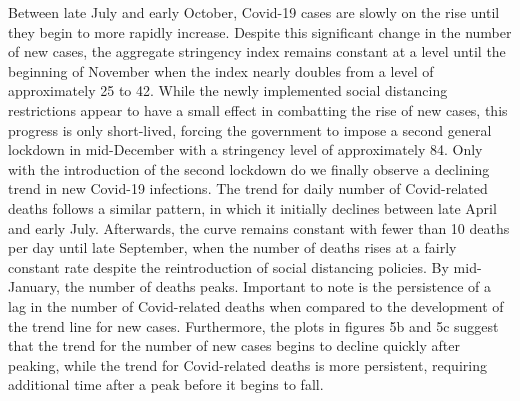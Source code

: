 Between late July and early October, Covid-19 cases are slowly on the rise until they begin to more rapidly increase. Despite this significant change in the number of new cases, the aggregate stringency index remains constant at a level until the beginning of November when the index nearly doubles from a level of approximately 25 to 42. While the newly implemented social distancing restrictions appear to have a small effect in combatting the rise of new cases, this progress is only short-lived, forcing the government to impose a second general lockdown in mid-December with a stringency level of approximately 84. Only with the introduction of the second lockdown do we finally observe a declining trend in new Covid-19 infections. The trend for daily number of Covid-related deaths follows a similar pattern, in which it initially declines between late April and early July. Afterwards, the curve remains constant with fewer than 10 deaths per day until late September, when the number of deaths rises at a fairly constant rate despite the reintroduction of social distancing policies. By mid-January, the number of deaths peaks. Important to note is the persistence of a lag in the number of Covid-related deaths when compared to the development of the trend line for new cases. Furthermore, the plots in figures 5b and 5c suggest that the trend for the number of new cases begins to decline quickly after peaking, while the trend for Covid-related deaths is more persistent, requiring additional time after a peak before it begins to fall.